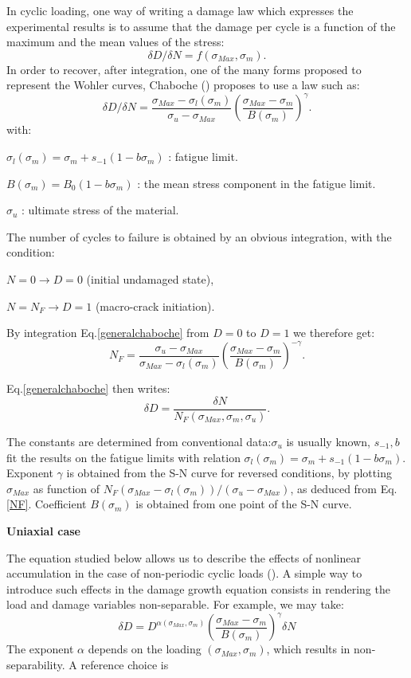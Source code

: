 In cyclic loading, one way of writing a damage law which expresses the experimental results is to assume that the damage per cycle is a function of the maximum and the mean values of the stress:
$$\delta D/\delta N=f(\sigma_{Max},\sigma_m).$$
In order to recover, after integration, one of the many forms proposed to represent the Wohler curves, Chaboche (\cite{FFE:FFE1}) proposes to use a law such as:
\begin{equation}
\delta D/\delta N=\frac{\sigma_{Max}-\sigma_l(\sigma_m)}{\sigma_{u}-\sigma_{Max}}\left( \frac{\sigma_{Max}-\sigma_m}{B(\sigma_m)}\right) ^{\gamma}.
\label{generalchaboche}
\end{equation}
with:

$\sigma_l(\sigma_m)=\sigma_m+s_{-1}(1-b\sigma_m)$ :  fatigue limit.

$B(\sigma_m)=B_0(1-b\sigma_m)$ : the mean stress component in the fatigue limit.

$\sigma_u$ : ultimate stress of the material.

The number of cycles to failure is obtained by an obvious integration, with the condition:

$N=0 \to D=0$ (initial undamaged state),

$N=N_F \to D=1$ (macro-crack initiation).

By integration Eq.\eqref{generalchaboche} from $D=0$ to $D=1$ we therefore get:
\begin{equation}N_F=\frac{\sigma_{u}-\sigma_{Max}}{\sigma_{Max}-\sigma_l(\sigma_m)}\left(\frac{\sigma_{Max}-\sigma_m}{B(\sigma_m)}\right)^{-\gamma}.
\label{NF}
\end{equation}

Eq.\eqref{generalchaboche} then writes:
$$\delta D=\dfrac{\delta N}{N_F(\sigma_{Max}, \sigma_m, \sigma_{u})}.$$

The constants are determined from conventional data:$\sigma_u$ is usually known, $s_{-1},b$ fit the results on the fatigue limits with relation $\sigma_l(\sigma_m)=\sigma_m+s_{-1}(1-b\sigma_m)$. Exponent $\gamma$ is obtained from the S-N curve for reversed conditions, by plotting $\sigma_{Max}$ as function of $N_F(\sigma_{Max}-\sigma_l(\sigma_m))/(\sigma_{u}-\sigma_{Max})$, as deduced from Eq.\eqref{NF}. Coefficient $B(\sigma_m)$ is obtained from one point of the S-N curve.

\vspace{6pt}
\textbf{Uniaxial case}
\vspace{6pt}

The equation studied below allows us to describe the effects of nonlinear accumulation in the case of non-periodic cyclic loads (\cite{FFE:FFE1}). A simple way to introduce such effects in the damage growth equation consists in rendering the load and damage variables non-separable. For example, we may take:
$$\delta D=D^{\alpha(\sigma_{Max},\sigma_m)}\left(\frac{\sigma_{Max}-\sigma_m}{B(\sigma_m)}\right)^\gamma\delta N$$
The exponent $\alpha$ depends on the loading $(\sigma_{Max},\sigma_m)$, which results in non-separability. A reference choice is

